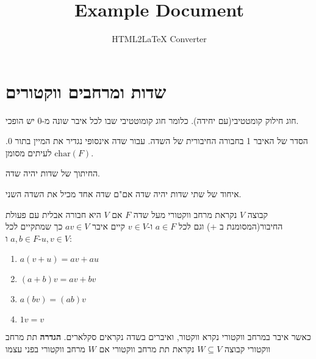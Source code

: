 \documentclass{tstextbook}
\begin{document}
\title{Example Document}
\author{HTML2LaTeX Converter}
\maketitle


\section{שדות ומרחבים ווקטורים}

\begin{definition}[שדה]
חוג חילוק קומטטיבי(עם יחידה). כלומר חוג קומוטטיבי שבו לכל איבר שונה מ-0 יש הופכי.

\end{definition}
\begin{definition}
הסדר של האיבר 1 בחבורה החיבורית של השדה. עבור שדה אינסופי נגדיר את המיין בתור 0. לעיתים מסומן \(\mathrm{char}(F)\).

\end{definition}
\begin{proposition}
החיתוך של שדות יהיה שדה.

\end{proposition}
\begin{proposition}
איחוד של שתי שדות יהיה שדה אם"ם שדה אחד מכיל את השדה השני.

\end{proposition}
\begin{definition}
קבוצה \(V\) נקראת מרחב ווקטורי מעל שדה \(F\) אם \(V\) היא חבורה אבלית עם פעולת החיבור(המסומנת ב \(+\)) וגם לכל \(a\in F\) ו-\(v \in V\) קיים איבר \(av \in V\) כך שמתקיים לכל \(a,b \in F\) ו-\(u,v \in V\):

  \begin{enumerate}
    \item \(a(v+u)=av+a u\)


    \item \((a+b)v=av+bv\)


    \item \(a(bv)=(a b)v\)


    \item \(1v=v\)


  \end{enumerate}
\end{definition}
כאשר איבר במרחב ווקטורי נקרא ווקטור, ואיברים בשדה נקראים סקלארים.
\textbf{הגדרה} תת מרחב ווקטורי
קבוצה \(W\subseteq V\) נקראת תת מרחב ווקטורי אם \(W\) מרחב ווקטורי בפני עצמו
\end{document}
